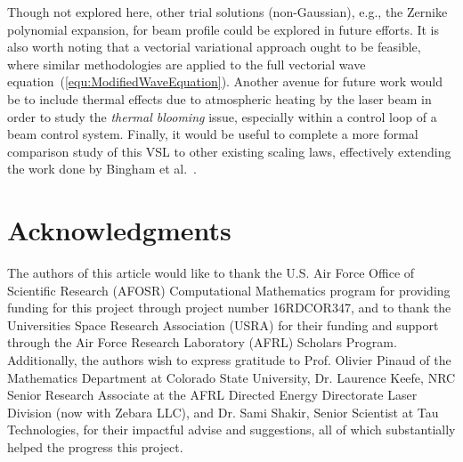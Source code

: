 \documentclass[9pt,twocolumn,twoside]{osajnl}
\begin{document}
Though not explored here, other trial solutions (non-Gaussian), e.g., the Zernike polynomial expansion, for beam profile could be explored in future efforts.
It is also worth noting that a vectorial variational approach ought to be feasible, where similar methodologies are applied to the full vectorial wave equation~(\ref{equ:ModifiedWaveEquation}).
Another avenue for future work would be to include thermal effects due to atmospheric heating 
by the laser beam in order to study the {\em thermal blooming} issue, especially within a control loop of a beam control system.  
Finally, it would be useful to complete a more formal comparison study of this VSL to other existing scaling laws, effectively extending the work done by Bingham et al.~\cite{bingham2018wave}.  




\section*{Acknowledgments}

The authors of this article would like to thank the U.S. Air Force Office of Scientific Research 
(AFOSR) Computational Mathematics program for providing funding for this project through project 
number 16RDCOR347, and to thank the Universities Space Research Association (USRA) for their funding 
and support through the Air Force Research Laboratory (AFRL) Scholars Program.  Additionally, the 
authors  wish to express gratitude to Prof. Olivier Pinaud of the Mathematics Department at Colorado State 
University, Dr. Laurence Keefe, NRC Senior Research Associate at the AFRL Directed Energy Directorate 
Laser Division (now with Zebara LLC), and Dr. Sami Shakir, Senior Scientist at Tau Technologies, 
for their impactful advise and suggestions, all of which substantially helped the progress this project.







\end{document}
